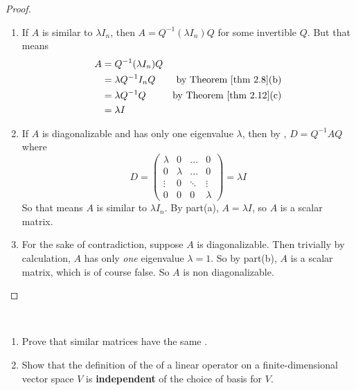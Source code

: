 \begin{proof} \ 

\begin{enumerate}
\item If \(A\) is similar to \(\lambda I_n\), then \(A = Q^{-1} (\lambda I_n) Q\) for some invertible \(Q\).
But that means
\begin{align*}
    A & = Q^{-1} (\lambda I_n) Q \\
      & = \lambda Q^{-1} I_n Q & \text{by \THM{2.8}(b)} \\
      & = \lambda Q^{-1} Q & \text{by \THM{2.12}(c)} \\
      & = \lambda I
\end{align*}

\item If \(A\) is diagonalizable and has only one eigenvalue \(\lambda\), then by , \(D = Q^{-1} A Q\) where
\[
    D = \begin{pmatrix}
        \lambda & 0       & ...    & 0 \\
        0       & \lambda & ...    & 0 \\
        \vdots  & 0       & \ddots & \vdots \\
        0       & 0       & 0      & \lambda
    \end{pmatrix} = \lambda I
\]
So that means \(A\) is similar to \(\lambda I_n\).
By part(a), \(A = \lambda I\), so \(A\) is a scalar matrix.

\item
For the sake of contradiction, suppose \(A\) is diagonalizable.
Then trivially by calculation, \(A\) has only \emph{one} eigenvalue \(\lambda = 1\).
So by part(b), \(A\) is a scalar matrix, which is of course false.
So \(A\) is non diagonalizable.
\end{enumerate}
\end{proof}

\begin{exercise} \label{exercise 5.1.13} \ 

\begin{enumerate}
\item Prove that similar matrices have the same \CPOLY{}.
\item Show that the definition of the \CPOLY{} of a linear operator on a finite-dimensional vector space \(V\) is \textbf{independent} of
the choice of basis for \(V\).
\end{enumerate}
\end{exercise}

